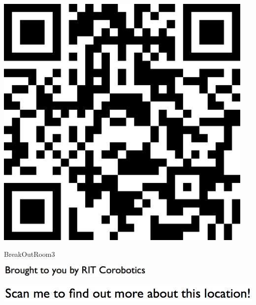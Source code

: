 \documentclass[letterpaper]{article}
\begin{document}
 \vspace{0.5in} 
 
 \begingroup 
 \centerline{\includegraphics[scale=1,width=5in,height=5in]{BreakOutRoom3.png}} 
 \endgroup 
 \vspace*{\fill} 

 \hfill{\small BreakOutRoom3} 

  \vspace{0.7in} 
 
 \centerline{\includegraphics[scale=1,width=3in]{text-bottom.png}} 
 
 \pagebreak 
{} 
 \vspace*{\fill} 
 
  \centerline{\includegraphics[scale=1,width=6in]{text-top.png}} 
 
 \vspace{0.5in} 
 
\end{document}
